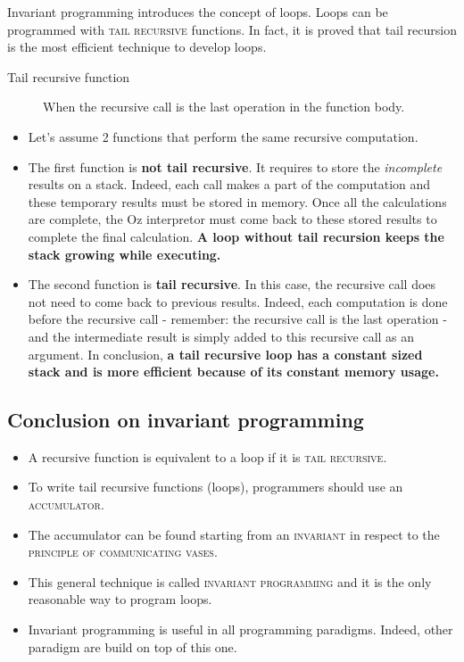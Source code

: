 \documentclass[11pt,a4paper,twoside,openright]{report}
\begin{document}
Invariant programming introduces the concept of loops. Loops can be programmed 
with \textsc{tail recursive} functions. In fact, it is proved that tail recursion is 
the most efficient technique to develop loops.
\begin{description}
 \item[Tail recursive function] When the recursive call is the last operation 
in the function body.
\end{description}

\begin{itemize}
	\item Let's assume 2 functions that perform the same recursive 
computation. 
	\item The first function is \textbf{not tail recursive}. It requires to 
store the \textit{incomplete} results on a stack. Indeed, each call makes a 
part 
of the computation and these temporary results must be stored in memory. Once 
all the calculations are complete, the Oz interpretor must come back to these 
stored results to complete the final calculation. \textbf{A loop without tail 
recursion keeps the stack growing while executing.}
	\item The second function is \textbf{tail recursive}. In this case, the 
recursive call does not need to come back to previous results. Indeed, each 
computation is done before the recursive call - remember: the recursive call 
is 
the last operation - and the intermediate result is simply added to this 
recursive call as an argument. In conclusion, \textbf{a tail recursive loop has 
a constant sized stack and is more efficient because of its constant memory 
usage.}
\end{itemize}

\subsection{Conclusion on invariant programming}

\begin{itemize}
	\item A recursive function is equivalent to a loop if it is 
\textsc{tail recursive}.
	\item To write tail recursive functions (loops), programmers should use 
an \textsc{accumulator}.
	\item The accumulator can be found starting from an \textsc{invariant} 
in respect to the \textsc{principle of communicating vases}.
	\item This general technique is called \textsc{invariant programming} 
and it is the only reasonable way to program loops.
	\item Invariant programming is useful in all programming paradigms. 
Indeed, other paradigm are build on top of this one.
\end{itemize}
\end{document}

